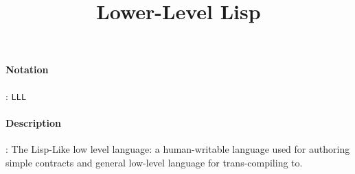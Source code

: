 \documentclass[10pt,a4paper,oneside]{scrartcl}
\author{}
\title{Lower-Level Lisp}
\date{}
\begin{document}
\maketitle
\paragraph{Notation}: \texttt{LLL}
\paragraph{Description}: The Lisp-Like low level language: a human-writable language used for authoring simple contracts and general low-level language for trans-compiling to. 
\end{document}

